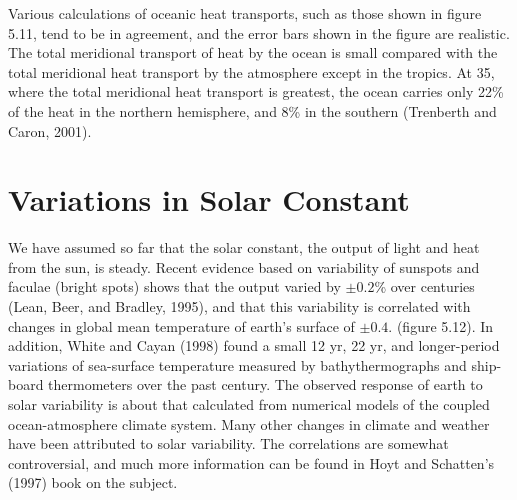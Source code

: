 Various calculations of oceanic heat transports,
such as those shown in figure 5.11, tend to be
in agreement, and the error bars shown in the figure are realistic.
The total meridional transport of heat by the ocean is small compared
with the total meridional heat transport by the atmosphere except in
the tropics. At 35\degrees, where the total meridional heat transport
is greatest, the ocean carries only 22\% of the heat in the northern
hemisphere, and 8\% in the southern (Trenberth and Caron, 2001).


\section{Variations in Solar Constant}
We have assumed so far that the
solar constant, the output of light and heat from the sun, is
steady. Recent evidence based on variability of sunspots and faculae
(bright spots) shows that the output varied by $\pm 0.2$\% over
centuries (Lean, Beer, and Bradley, 1995), and that this variability
is correlated with changes in global mean temperature of earth's
surface of $\pm 0.4$.  (figure 5.12). In addition, White
and Cayan (1998) found a small 12 yr, 22 yr, and longer-period
variations of sea-surface temperature measured by
bathythermographs and ship-board
thermometers over the past century. The observed response of earth to
solar variability is about that calculated from numerical models of
the coupled ocean-atmosphere climate system. Many other changes in
climate and weather have been attributed to solar variability. The
correlations are somewhat controversial, and much more information can
be found in Hoyt and Schatten's (1997) book on the subject.

